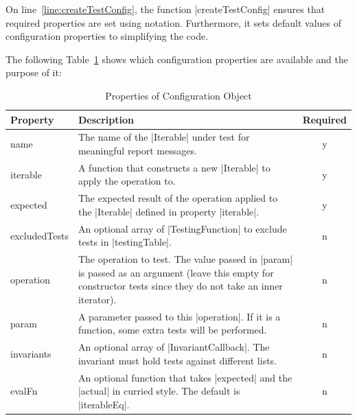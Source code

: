 On line~\ref{line:createTestConfig}, the function |createTestConfig| ensures
that required properties are set using notation. Furthermore, it sets default
values of configuration properties to simplifying the code.

The following Table~\ref{tbl:testing_table} shows which configuration 
properties are available and the purpose of it:


\renewcommand{\arraystretch}{1.5}
\begin{table}[H]
  \center
  \begin{tabular}{ l m{10cm} c}
    \textbf{Property} & \textbf{Description} & \textbf{Required}\\
    \hline
    name            & The name of the |Iterable| under test for meaningful 
                      report messages. 
                    & y 
                    \\ 
    iterable        & A function that constructs a new |Iterable| to apply the 
                      operation to. 
                    & y 
                    \\  
    expected        & The expected result of the operation applied to the |Iterable|
                      defined in property |iterable|.
                    & 
                    y  \\ 
    excludedTests   & An optional array of |TestingFunction| to exclude tests
                      in |testingTable|. 
                    & n 
                    \\
    operation       & The operation to test. The value passed in |param| is
                      passed as an argument (leave this empty for constructor 
                      tests since they do not take an inner iterator). 
                    & n 
                    \\
    param           & A parameter passed to this |operation|. If it is a
                      function, some extra tests will be performed. 
                    & n
                    \\ 
    invariants      & An optional array of |InvariantCallback|. The invariant 
                      must hold tests against different lists. 
                    & n
                    \\
    evalFn          & An optional function that takes |expected| and the |actual| 
                      in curried style. The default is |iterableEq|.
                    & n 
                    \\
  \end{tabular}
  \caption{Properties of Configuration Object}
\label{tbl:testing_table}
\end{table}


